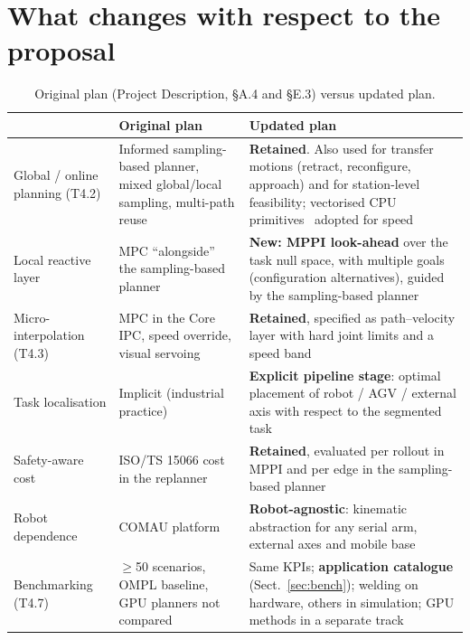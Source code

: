 \documentclass[10pt,a4paper]{article}
\begin{document}
\section{What changes with respect to the proposal}
\begin{table}[h]
\centering\small
\caption{Original plan (Project Description, \S A.4 and \S E.3) versus updated plan.}\label{tab:delta}
\begin{tabularx}{\textwidth}{@{}L{3.1cm}YY@{}}
\toprule
 & \textbf{Original plan} & \textbf{Updated plan} \\
\midrule
Global / online planning (T4.2) & Informed sampling-based planner, mixed global/local sampling, multi-path reuse & \textbf{Retained}. Also used for transfer motions (retract, reconfigure, approach) and for station-level feasibility; vectorised CPU primitives~\cite{thomason2024vamp} adopted for speed \\
Local reactive layer & MPC ``alongside'' the sampling-based planner & \textbf{New: MPPI look-ahead} over the task null space, with multiple goals (configuration alternatives), guided by the sampling-based planner~\cite{trevisan2024biasedmppi,tao2023rrtmppi} \\
Micro-interpolation (T4.3) & MPC in the Core IPC, speed override, visual servoing & \textbf{Retained}, specified as path--velocity layer with hard joint limits and a speed band~\cite{faulwasser2017pathfollowing,lange2016pathaccurate,faroni2020scaling} \\
Task localisation & Implicit (industrial practice) & \textbf{Explicit pipeline stage}: optimal placement of robot / AGV / external axis with respect to the segmented task~\cite{weingartshofer2021tcpbase,nguyen2023taskclustering} \\
Safety-aware cost & ISO/TS 15066 cost in the replanner~\cite{faroni2022safetyaware} & \textbf{Retained}, evaluated per rollout in MPPI and per edge in the sampling-based planner \\
Robot dependence & COMAU platform & \textbf{Robot-agnostic}: kinematic abstraction for any serial arm, external axes and mobile base \\
Benchmarking (T4.7) & $\geq$50 scenarios, OMPL baseline, GPU planners not compared & Same KPIs; \textbf{application catalogue} (Sect.~\ref{sec:bench}); welding on hardware, others in simulation; GPU methods in a separate track \\
\bottomrule
\end{tabularx}
\end{table}
\end{document}
